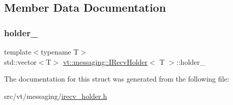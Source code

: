 \subsection{Member Data Documentation}
\mbox{\label{structvt_1_1messaging_1_1_i_recv_holder_ad906203e102f9180b56d66393bd47c55}} 
\subsubsection{\texorpdfstring{holder\+\_\+}{holder\_}}
{\footnotesize\ttfamily template$<$typename T$>$ \\
std\+::vector$<$T$>$ \hyperlink{structvt_1_1messaging_1_1_i_recv_holder}{vt\+::messaging\+::\+I\+Recv\+Holder}$<$ T $>$\+::holder\+\_\+\hspace{0.3cm}{\ttfamily [private]}}



The documentation for this struct was generated from the following file\+:\begin{DoxyCompactItemize}
\item 
src/vt/messaging/\hyperlink{irecv__holder_8h}{irecv\+\_\+holder.\+h}\end{DoxyCompactItemize}
